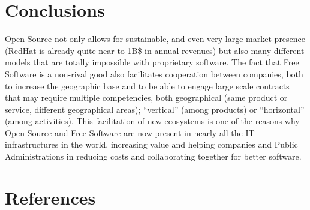 \section*{Conclusions}

Open Source not only allows for sustainable, and even very large market presence
(RedHat is already quite near to 1B\$ in annual revenues) but also many
different models that are totally impossible with proprietary software. The fact
that Free Software is a non-rival good also facilitates cooperation between
companies, both to increase the geographic base and to be able to engage large
scale contracts that may require multiple competencies, both geographical (same
product or service, different geographical areas); ``vertical'' (among products)
or ``horizontal'' (among activities). This facilitation of new ecosystems is one
of the reasons why Open Source and Free Software are now present in nearly all
the IT infrastructures in the world, increasing value and helping companies and
Public Administrations in reducing costs and collaborating together for better
software.

\section*{References}

